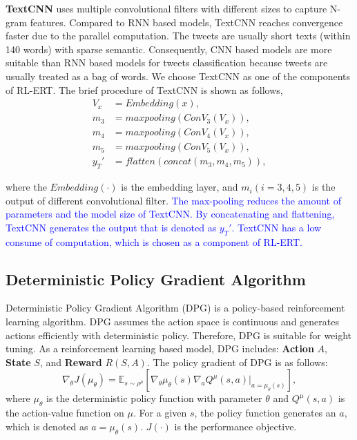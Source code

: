 \textbf{TextCNN} \cite{DBLP:conf/emnlp/Kim14} uses multiple convolutional filters with different sizes to capture N-gram features. Compared to RNN based models, TextCNN reaches convergence faster due to the parallel computation. The tweets are usually short texts (within 140 words) with sparse semantic. Consequently, CNN based models are more suitable than RNN based models for tweets classification because tweets are usually treated as a bag of words. We choose TextCNN as one of the components of RL-ERT. The brief procedure of TextCNN is shown as follows,
\begin{align}\label{eq:tcnn}
V_x &= Embedding(x), \\
m_3 &= maxpooling(ConV_3(V_x)),\\
m_4 &= maxpooling(ConV_4(V_x)),\\
m_5 &= maxpooling(ConV_5(V_x)),\\
y_T' &= flatten(concat(m_3, m_4, m_5)),
\end{align}

where the $Embedding(\cdot)$ is the embedding layer, and $m_i (i = 3,4,5)$ is the output of different convolutional filter. \textcolor{blue}{The max-pooling reduces the amount of parameters and the model size of TextCNN. By concatenating and flattening, TextCNN generates the output that is denoted as $y_T'$. TextCNN has a low consume of computation, which is chosen as a component of RL-ERT.} 

\subsection{Deterministic Policy Gradient Algorithm}
Deterministic Policy Gradient Algorithm (DPG) \cite{DBLP:conf/icml/SilverLHDWR14} is a policy-based reinforcement learning algorithm. DPG assumes the action space is continuous and generates actions efficiently with deterministic policy. Therefore, DPG is suitable for weight tuning. As a reinforcement learning based model, DPG includes: \textbf{Action} $A$, \textbf{State} $S$, and \textbf{Reward} $R(S,A)$. The policy gradient of DPG is as follows:
\begin{equation}
\nabla_\theta J(\mu_\theta) =  \mathbb{E}_{s \sim \rho^\mu} \left[\nabla_\theta \mu_\theta (s)\nabla_a Q^\mu (s, a) |_{a = \mu_\theta(s)}  \right],
\end{equation}
where $\mu_\theta$ is the deterministic policy function with parameter $\theta$ and $Q^\mu(s, a)$ is the action-value function on $\mu$. For a given $s$, the policy function generates an $a$, which is denoted as $a=\mu_\theta(s)$. $J(\cdot)$ is the performance objective.
